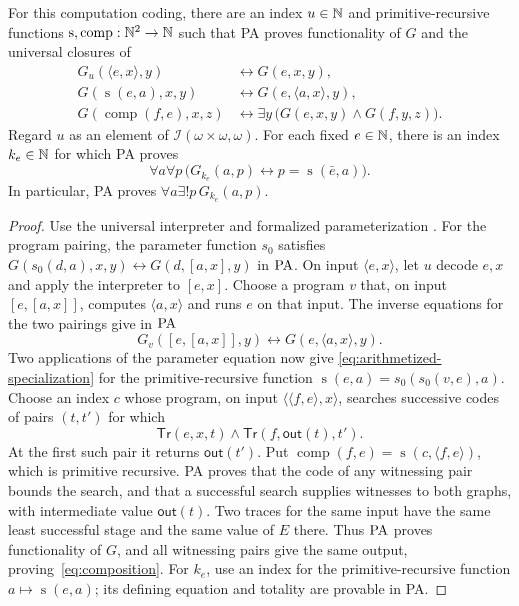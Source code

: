 \begin{lemma}\label{lem:arithmetized-evaluation}
For this computation coding, there are an index $u\in\mathbb N$ and
primitive-recursive functions
$\operatorname{s},\operatorname{comp}:\mathbb N^2\to\mathbb N$
such that PA proves functionality
of $G$ and the universal closures of
\begin{align}
 G_u(\langle e,x\rangle,y)
   &\leftrightarrow G(e,x,y),
   \label{eq:arithmetized-universal}\\
 G(\operatorname{s}(e,a),x,y)
   &\leftrightarrow G(e,\langle a,x\rangle,y),
   \label{eq:arithmetized-specialization}\\
 G(\operatorname{comp}(f,e),x,z)
   &\leftrightarrow
     \exists y\,\bigl(G(e,x,y)\land G(f,y,z)\bigr).
   \label{eq:composition}
\end{align}
Regard $u$ as an element of $\mathcal I(\omega\times\omega,\omega)$.
For each fixed $e\in\mathbb N$, there is an index
$k_e\in\mathbb N$ for which PA proves
\[
 \forall a\forall p\,
 \bigl(G_{k_e}(a,p)\leftrightarrow
       p=\operatorname{s}(\bar e,a)\bigr).
\]
In particular, PA proves $\forall a\exists!p\,G_{k_e}(a,p)$.
\end{lemma}
\begin{proof}
Use the universal interpreter and formalized parameterization
\cite[p.~108; p.~115, Note~1]{Montagna}. For the program pairing,
the parameter function $s_0$ satisfies
$G(s_0(d,a),x,y)\leftrightarrow G(d,[a,x],y)$ in $\mathrm{PA}$.
On input $\langle e,x\rangle$, let $u$ decode $e,x$ and apply the
interpreter to $[e,x]$. Choose a program $v$ that, on input
$[e,[a,x]]$, computes $\langle a,x\rangle$ and runs $e$ on that input.
The inverse equations for the two pairings give in $\mathrm{PA}$
\[
 G_v([e,[a,x]],y)\longleftrightarrow G(e,\langle a,x\rangle,y).
\]
Two applications of the parameter equation now give
\eqref{eq:arithmetized-specialization} for the primitive-recursive
function $\operatorname{s}(e,a)=s_0(s_0(v,e),a)$.
Choose an index $c$ whose program, on input
$\langle\langle f,e\rangle,x\rangle$, searches successive codes
of pairs $(t,t')$ for which
\[
 \mathsf{Tr}(e,x,t)\land\mathsf{Tr}(f,\mathsf{out}(t),t').
\]
At the first such pair it returns $\mathsf{out}(t')$. Put
$\operatorname{comp}(f,e)=\operatorname{s}(c,\langle f,e\rangle)$,
which is primitive recursive. PA proves that the code of any
witnessing pair bounds the search, and that a successful search
supplies witnesses to both graphs, with intermediate value
$\mathsf{out}(t)$. Two traces for the same input have the same least successful stage
and the same value of $E$ there. Thus $\mathrm{PA}$ proves functionality of
$G$, and all witnessing pairs give the same output, proving~\eqref{eq:composition}.
For $k_e$, use an index for the primitive-recursive function
$a\mapsto\operatorname{s}(e,a)$; its defining equation and
totality are provable in PA.
\end{proof}

